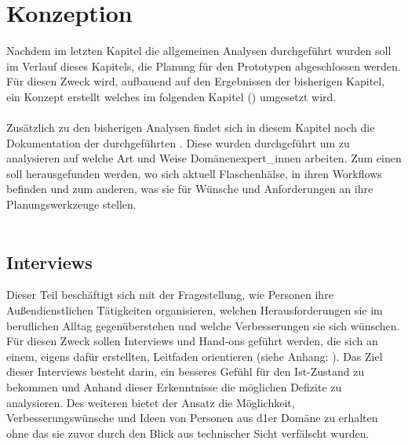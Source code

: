 \documentclass[Bachelorarbeit.tex]{subfiles}
\begin{document}
\chapter{Konzeption}
\label{chap:entwicklung}
Nachdem im letzten Kapitel die allgemeinen Analysen durchgeführt wurden soll im Verlauf dieses Kapitels, die Planung für den Prototypen abgeschlossen werden.
Für diesen Zweck wird, aufbauend auf den Ergebnissen der bisherigen Kapitel, ein Konzept erstellt welches im folgenden Kapitel () umgesetzt wird. \\
\\
Zusätzlich zu den bisherigen Analysen findet sich in diesem Kapitel noch die Dokumentation der durchgeführten .
Diese  wurden durchgeführt um zu analysieren auf welche Art und Weise  Domänenexpert\_innen arbeiten.
Zum einen soll herausgefunden werden, wo sich aktuell Flaschenhälse, in ihren Workflows befinden und zum anderen, was sie für Wünsche und Anforderungen an ihre Planungswerkzeuge stellen.\\
\\

\section{Interviews}
\label{chap:analyse:sec:interviews}
Dieser Teil beschäftigt sich mit der Fragestellung, wie Personen ihre Außendienstlichen Tätigkeiten organisieren, welchen Herausforderungen sie im beruflichen Alltag gegenüberstehen und welche Verbesserungen sie sich wünschen. 
Für diesen Zweck sollen Interviews und Hand-ons  geführt werden, die sich an einem, eigens dafür erstellten, Leitfaden orientieren (siehe Anhang: ). 
Das Ziel dieser Interviews besteht darin, ein besseres Gefühl für den Ist-Zustand zu bekommen und Anhand dieser Erkenntnisse die möglichen Defizite zu analysieren.
Des weiteren bietet der Ansatz die Möglichkeit, Verbesserungswünsche und Ideen von Personen aus d1er Domäne zu erhalten ohne das sie zuvor durch den Blick aus technischer Sicht verfälscht wurden.
\end{document}
